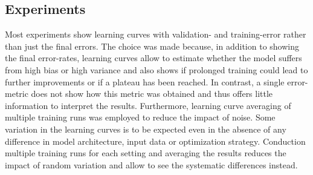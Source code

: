 \subsection{Experiments}

Most experiments show learning curves with validation- and training-error rather than just the final errors. The choice was made because, in addition to showing the final error-rates, learning curves allow to estimate whether the model suffers from high bias or high variance and also shows if prolonged training could lead to further improvements or if a plateau has been reached. In contrast, a single error-metric does not show how this metric was obtained and thus offers little information to interpret the results. Furthermore, learning curve averaging of multiple training runs was employed to reduce the impact of noise. Some variation in the learning curves is to be expected even in the absence of any difference in model architecture, input data or optimization strategy. Conduction multiple training runs for each setting and averaging the results reduces the impact of random variation and allow to see the systematic differences instead.



